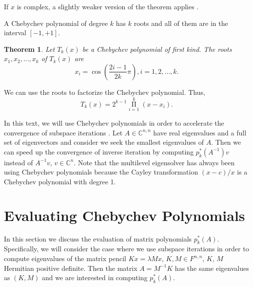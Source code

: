 \documentclass[%
	paper=a4,
	fontsize=10pt,
	DIV11,BCOR10mm,
	numbers=noenddot,
	abstract=yes
]{scrartcl}
\newcommand{\F}{\mathbb{C}}
\newtheorem{theorem}{Theorem}[section]
\theoremstyle{definition}
\begin{document}
If $x$ is complex, a slightly weaker version of the theorem applies
\cite[Theorem 1]{Fischer1989}.

A Chebychev polynomial of degree $k$ has $k$ roots and all of them are in the
interval $[-1, +1]$.

\begin{theorem}
	Let $T_k(x)$ be a Chebychev polynomial of first kind. The roots $x_1, x_2,
	\dotsc, x_k$ of $T_k(x)$ are
	\[
		x_i = \cos \left( \frac{2i-1}{2k} \pi \right),
		i = 1, 2, \dotsc, k.
	\]
\end{theorem}

We can use the roots to factorize the Chebychev polynomial. Thus,
\[ T_k(x) = 2^{k-1} \mathop{\Pi}\limits_{i=1}^k (x - x_i). \]

In this text, we will use Chebychev polynomials in order to accelerate the
convergence of subspace iterations \cite[§5, §7.5]{Saad2011}. Let $A \in
\F^{n,n}$ have real eigenvalues and a full set of eigenvectors and consider we
seek the smallest eigenvalues of $A$. Then we can speed up the convergence of
inverse iteration by computing $p_k^*(A^{-1}) v$ instead of $A^{-1} v$, $v \in
\F^n$. Note that the multilevel eigensolver has always been using Chebychev
polynomials because the Cayley transformation $(x - c) / x$ is a Chebychev
polynomial with degree 1.



\section{Evaluating Chebychev Polynomials}

In this section we discuss the evaluation of matrix polynomials $p_k^*(A)$.
Specifically, we will consider the case where we use subspace iterations in
order to compute eigenvalues of the matrix pencil $K x = \lambda M x$, $K, M \in
F^{n,n}$, $K$, $M$ Hermitian positive definite. Then the matrix $A = M^{-1} K$
has the same eigenvalues as $(K, M)$ and we are interested in computing
$p_k^*(A)$.
\end{document}
